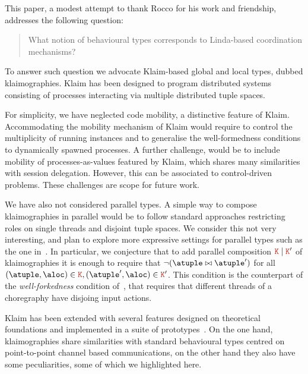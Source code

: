 

This paper, a modest attempt to thank Rocco for his work and
friendship, addresses the following question:
%
\begin{quote}
  What notion of behavioural types corresponds to Linda-based
  coordination mechanisms?
\end{quote}
%
To answer such question we advocate Klaim-based global and local
types, dubbed klaimographies.
%
Klaim has been designed to program distributed systems consisting of
processes interacting via multiple distributed tuple spaces.

For simplicity, we have neglected code mobility, a distinctive feature
of Klaim.
%
Accommodating the mobility mechanism of Klaim would require to control
the multiplicity of running instances and to generalise the
well-formedness conditions to dynamically spawned processes.
%
A further challenge, would be to include mobility of
processes-as-values featured by Klaim, which shares many
similarities with session delegation.
%
However, this can be associated to control-driven problems.
%
These challenges are scope for future work.

We have also not considered parallel types.
%
A simple way to compose klaimographies in parallel would be to follow standard
approaches restricting roles on single threads and disjoint tuple
spaces.
%
We consider this not very interesting, and plan to explore more expressive
settings for parallel types such as the one in~\cite{gt16,gt17}.
%
In particular, we conjecture that to add parallel composition
$\aK \mid \aK'$ of klaimographies it is enough to require that
$\neg(\atuple \matches \atuple')$ for all
$(\atuple, \aloc) \in \aK, (\atuple', \aloc) \in \aK'$.
%
This condition is the counterpart of the \emph{well-forkedness}
condition of~\cite{gt16,gt17}, that requires that different threads of
a choregraphy have disjoing input actions.

Klaim has been extended with several features designed on theoretical
foundations and implemented in a suite of
prototypes~\cite{klaim}.
%
On the one hand, klaimographies share similarities with standard
behavioural types centred on point-to-point channel based
communications, on the other hand they also have some peculiarities,
some of which we highlighted here.

